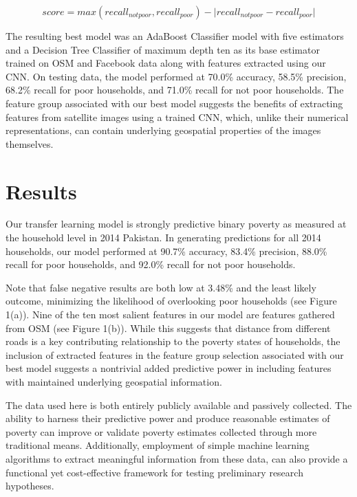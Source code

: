 \documentclass[8pt, oneside]{article}
\begin{document}
\begin{equation*}
  score = max(recall_{not poor},  recall _{poor}) - \lvert recall_{not poor} - recall _{poor} \rvert
\end{equation*}
\par
The resulting best model was an AdaBoost Classifier model with five estimators and a Decision Tree Classifier of maximum depth ten as its base estimator trained on OSM and Facebook data along with features extracted using our CNN. On testing data, the model performed at 70.0\% accuracy, 58.5\% precision, 68.2\% recall for poor households, and 71.0\% recall for not poor households. The feature group associated with our best model suggests the benefits of extracting features from satellite images using a trained CNN, which, unlike their numerical representations, can contain underlying geospatial properties of the images themselves.

\section*{Results}
Our transfer learning model is strongly predictive binary poverty as measured at the household level in 2014 Pakistan. In generating predictions for all 2014 households, our model performed at 90.7\% accuracy, 83.4\% precision, 88.0\% recall for poor households, and 92.0\% recall for not poor households.
\par
Note that false negative results are both low at 3.48\% and the least likely outcome, minimizing the likelihood of overlooking poor households (see Figure 1(a)). Nine of the ten most salient features in our model are features gathered from OSM (see Figure 1(b)). While this suggests that distance from different roads is a key contributing relationship to the poverty states of households, the inclusion of extracted features in the feature group selection associated with our best model suggests a nontrivial added predictive power in including features with maintained underlying geospatial information.
\par
The data used here is both entirely publicly available and passively collected. The ability to harness their predictive power and produce reasonable estimates of poverty can improve or validate poverty estimates collected through more traditional means. Additionally, employment of simple machine learning algorithms to extract meaningful information from these data, can also provide a functional yet cost-effective framework for testing preliminary research hypotheses.
\par
\end{document}
